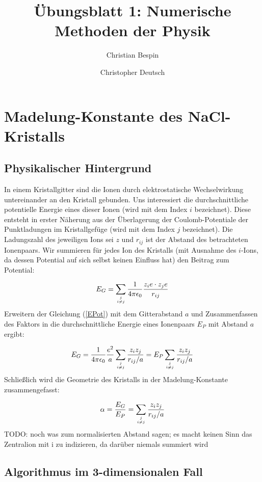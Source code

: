 \documentclass[10pt,a4paper]{article}
\author{Christian Bespin \and Christopher Deutsch}
\title{Übungsblatt 1: Numerische Methoden der Physik}
\begin{document}
\maketitle

\section{Madelung-Konstante des NaCl-Kristalls}
\subsection{Physikalischer Hintergrund}
In einem Kristallgitter sind die Ionen durch elektrostatische Wechselwirkung untereinander an den Kristall gebunden.
Uns interessiert die durchschnittliche potentielle Energie eines dieser Ionen (wird mit dem Index $i$ bezeichnet).
Diese entsteht in erster Näherung aus der Überlagerung der Coulomb-Potentiale der Punktladungen im Kristallgefüge
(wird mit dem Index $j$ bezeichnet). Die Ladungszahl des jeweiligen Ions sei $z$ und $r_{ij}$ ist der Abstand des
betrachteten Ionenpaars. Wir summieren für jedes Ion des Kristalls (mit Ausnahme des $i$-Ions, da dessen Potential
auf sich selbst keinen Einfluss hat) den Beitrag zum Potential:

\begin{align}
\label{EPot}
E_G = \sum_{j\atop i \neq j} \frac{1}{4 \pi \epsilon_0}  \frac{z_i e \cdot z_j e}{r_{ij}}
\end{align}
Erweitern der Gleichung (\ref{EPot}) mit dem Gitterabstand $a$ und Zusammenfassen des Faktors in die durchschnittliche
Energie eines Ionenpaars $E_P$ mit Abstand $a$ ergibt:

\begin{align}
E_G = \frac{1}{4 \pi \epsilon_0} \frac{e^2}{a} \sum_{j\atop i \neq j} \frac{z_i z_j}{r_{ij}/a} = E_P \sum_{j\atop i \neq j} \frac{z_i z_j}{r_{ij}/a}
\end{align}
Schließlich wird die Geometrie des Kristalls in der Madelung-Konstante zusammengefasst:

\begin{align}
\alpha = \frac{E_G}{E_P} = \sum_{j\atop i \neq j} \frac{z_i z_j}{r_{ij}/a}
\end{align}
TODO: noch was zum normalisierten Abstand sagen; es macht keinen Sinn das Zentralion mit i zu indizieren, da darüber niemals summiert wird

\subsection{Algorithmus im 3-dimensionalen Fall}
\end{document}
